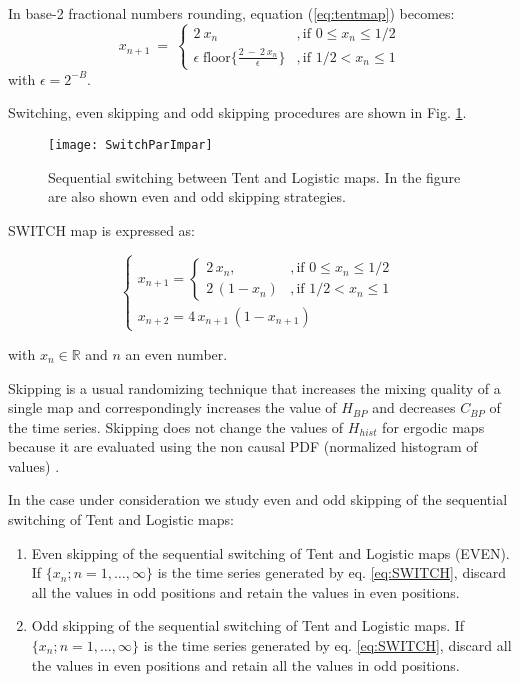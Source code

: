 In base-2 fractional numbers rounding, equation (\ref{eq:tentmap}) becomes:
\begin{equation}\label{eq:tentdecbin}
x_{n+1}~=~ \left\{ \begin{array}{ll}
2~{x_n} &, \textrm{if $0\leq x_n\leq 1/2$}\\
\epsilon \; \text{floor}\{\frac{2~-~2~x_n}{\epsilon}\} &, \textrm{if $1/2<x_n\leq 1$} 
\end{array} \right. 
\end{equation}
with $\epsilon=2^{-B}$.

Switching, even skipping and odd skipping procedures are shown in Fig. \ref{fig:seq}.

\begin{figure}[htpb]
\centering	
	\texttt{[image: SwitchParImpar]}
	\caption{Sequential switching between Tent and Logistic maps. In the figure are also shown even and odd skipping strategies.} \label{fig:seq}
\end{figure}

SWITCH map is expressed as:

\begin{equation}
\begin{cases}
x_{n+1}=
\begin{cases}
2\,x_n, &, \mbox{if } 0\leq x_n\leq 1/2 \\
2\,(1-x_n ) &, \mbox{if } 1/2<x_n\leq 1
\end{cases} \\
x_{n+2}=4\,x_{n+1}\,(1-x_{n+1})
\end{cases}\label{eq:SWITCH}
\end{equation}

\noindent with $x_n \in \mathbb{R}$ and $n$ an even number.

Skipping is a usual randomizing technique that increases the mixing quality of a single map and correspondingly increases the value of $H_{BP}$ and decreases $C_{BP} $ of the time series.
Skipping does not change the values of $H_{hist}$ for ergodic maps because it are evaluated using the non causal PDF (normalized histogram of values) \cite{DeMicco2008}.

In the case under consideration we study even and odd skipping of the sequential switching of Tent and Logistic maps:
\begin{enumerate}
	\item Even skipping of the sequential switching of Tent and Logistic maps (EVEN).\\
	If $\{x_n; n=1,\dots,\infty\}$ is the time series generated by eq. \eqref{eq:SWITCH}, discard all the values in odd positions and retain the values in even positions.
	\item Odd skipping of the sequential switching of Tent and Logistic maps.
	If $\{x_n; n=1,\dots,\infty\}$ is the time series generated by eq. \eqref{eq:SWITCH}, discard all the values in even positions and retain all the values in odd positions.
\end{enumerate}


